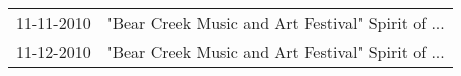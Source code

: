 \begin{supertabular}{ll}
 11-11-2010 &  "Bear Creek Music and Art Festival" Spirit of ... \\
 11-12-2010 &  "Bear Creek Music and Art Festival" Spirit of ... \\
\end{supertabular}
